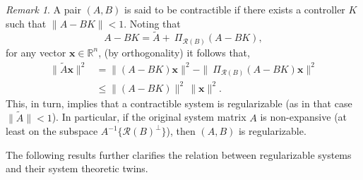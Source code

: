 \documentclass[journal]{IEEEtran}
\theoremstyle{definition}
\theoremstyle{remark}
\newtheorem{remark}{Remark}
\newcommand\x{{\bm x}}
\begin{document}
	\begin{remark}
	A pair $(A,B)$ is said to be contractible if there exists a controller $K$ such that $\|A - B K\| < 1$.
	Noting that
	\[A- B K = \widetilde{A} + ~\Pi_{\mathcal{R}(B)}(A - B K),\]
	for any vector $\x \in \mathbb{R}^n$, (by orthogonality)
	it follows that,
	\begin{align*}
	    \|\widetilde{A} \x\|^2  
	    &= \|(A-BK) \x\|^2 - \|~\Pi_{\mathcal{R}(B)} (A-BK)\x\|^2\\
	    &\leq \|(A-BK)\|^2 \, \|\x\|^2.
	\end{align*}
	This, in turn, implies that a contractible system is regularizable (as in that case $\|\widetilde{A}\|< 1$).
	In particular, if the original system matrix $A$ is non-expansive (at least on the subspace $A^{-1}\{\mathcal{R}(B)^\perp\}$), then $(A,B)$ is regularizable.
	\end{remark}
	

    The following results further clarifies the relation between regularizable systems and their system theoretic twins.
	
\end{document}
